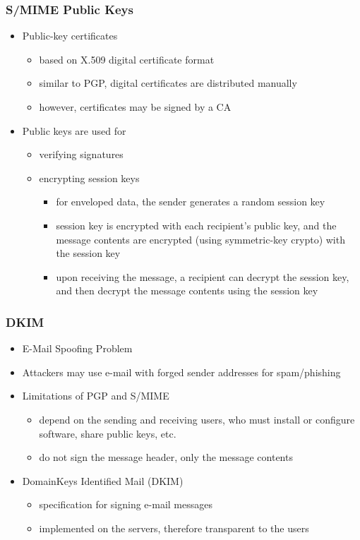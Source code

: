 \documentclass[final]{article}
\begin{document}
\subsubsection*{S/MIME Public Keys}
\begin{itemize}[nosep]
    \item Public-key certificates
          \begin{itemize}[nosep]
              \item based on X.509 digital certificate format
              \item similar to PGP, digital certificates are distributed manually
              \item however, certificates may be signed by a CA
          \end{itemize}
    \item Public keys are used for
          \begin{itemize}[nosep]
              \item verifying signatures
              \item encrypting session keys
                    \begin{itemize}[nosep]
                        \item for enveloped data, the sender generates a random session key
                        \item session key is encrypted with each recipient's public key, and the message contents are encrypted (using symmetric-key crypto) with the session key
                        \item upon receiving the message, a recipient can decrypt the session key, and then decrypt the message contents using the session key
                    \end{itemize}
          \end{itemize}
\end{itemize}
\subsubsection*{DKIM}
\begin{itemize}
    \item E-Mail Spoofing Problem
    \item Attackers may use e-mail with forged sender addresses for spam/phishing
    \item Limitations of PGP and S/MIME
          \begin{itemize}[nosep]
              \item depend on the sending and receiving users, who must install or configure software, share public keys, etc.
              \item do not sign the message header, only the message contents
          \end{itemize}
    \item DomainKeys Identified Mail (DKIM)
          \begin{itemize}[nosep]
              \item specification for signing e-mail messages
              \item implemented on the servers, therefore transparent to the users
          \end{itemize}
\end{itemize}
\end{document}
